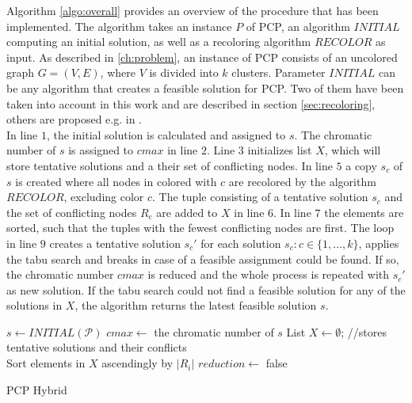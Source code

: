 Algorithm \ref{algo:overall} provides an overview of the procedure that has been implemented. The algorithm takes an instance $P$ of PCP, an algorithm $\mathit{INITIAL}$ computing an initial solution, as well as a recoloring algorithm $\mathit{RECOLOR}$ as input. As described in \ref{ch:problem}, an instance of PCP consists of an uncolored graph $G=(V,E)$, where $V$ is divided into $k$ clusters. Parameter $\mathit{INITIAL}$ can be any algorithm that creates a feasible solution for PCP. Two of them have been taken into account in this work and are described in section \ref{sec:recoloring}, others are proposed e.g. in \cite{li-00}.\\
In line $1$, the initial solution is calculated and assigned to $s$. The chromatic number of $s$ is assigned to $cmax$ in line $2$. Line $3$ initializes list $X$, which will store tentative solutions and a their set of conflicting nodes. In line $5$ a copy $s_c$ of $s$ is created where all nodes in colored with $c$ are recolored by the algorithm $\mathit{RECOLOR}$, excluding color $c$. The tuple consisting of a tentative solution $s_c$ and the set of conflicting nodes $R_c$ are added to $X$ in line $6$. In line $7$ the elements are sorted, such that the tuples with the fewest conflicting nodes are first. The loop in line $9$ creates a tentative solution $s_c'$ for each solution $s_c : c\in \{1,\ldots ,k\}$, applies the tabu search and breaks in case of a feasible assignment could be found. If so, the chromatic number $cmax$ is reduced and the whole process is repeated with $s_c'$ as new solution. If the tabu search could not find a feasible solution for any of the solutions in $X$, the algorithm returns the latest feasible solution $s$.

\begin{algorithm}[h]
$s \gets INITIAL(\mathcal{P})$\;
$cmax \gets$ the chromatic number of $s$\;
List $X \gets \emptyset $;   //stores tentative solutions and their conflicts\\
Sort elements in $X$ ascendingly by $|R_i|$\;
$reduction \gets$ false\;
\;
\caption{PCP Hybrid}
\label{algo:overall}
\end{algorithm}
\clearpage




